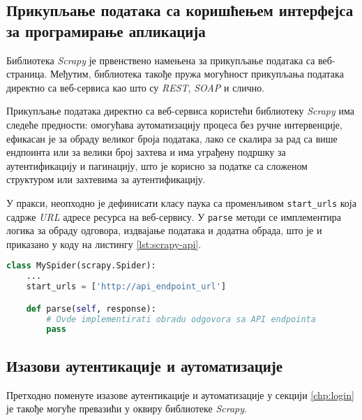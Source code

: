 \documentclass[12pt,oneside]{memoir}
\begin{document}
\subsection{Прикупљање података са коришћењем интерфејса за програмирање апликација}
Библиотека \textit{Scrapy} је првенствено намењена за прикупљање података са веб-страница. Међутим, библиотека такође пружа могућност прикупљања података директно са веб-сервиса као што су \textit{REST}, \textit{SOAP} и слично.

Прикупљање података директно са веб-сервиса користећи библиотеку \textit{Scrapy} има следеће предности: омогућава аутоматизацију процеса без ручне интервенције, ефикасан је за обраду великог броја података, лако се скалира за рад са више ендпоинта или за велики број захтева и има уграђену подршку за аутентификацију и пагинацију, што је корисно за податке са сложеном структуром или захтевима за аутентификацију.

У пракси, неопходно је дефинисати класу паука са променљивом \texttt{start\_urls} која садрже \textit{URL} адресе ресурса на веб-сервису. У \texttt{parse} методи се имплементира логика за обраду одговора, издвајање података и додатна обрада, што је и приказано у коду на листингу \ref{lst:scrapy-api}.

\begin{lstlisting}[language=Python, caption={Прикупљање података директно са \textit{API}}, label={lst:scrapy-api}]
class MySpider(scrapy.Spider):
    ...
    start_urls = ['http://api_endpoint_url']

    def parse(self, response):
        # Ovde implementirati obradu odgovora sa API endpointa
        pass
\end{lstlisting}

\subsection{Изазови аутентикације и аутоматизације}
Претходно поменуте изазове аутентикације и аутоматизације у секцији \ref{chp:login} је такође могуће превазићи у оквиру библиотеке \textit{Scrapy}.
\end{document}
